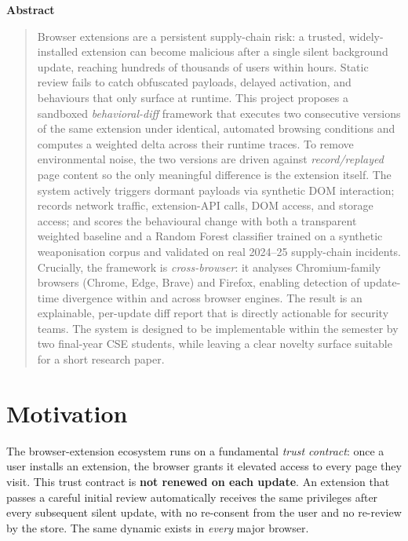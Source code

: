 \documentclass[11pt]{article}
\begin{document}
\begin{center}\textbf{Abstract}\end{center}
\begin{quote}
Browser extensions are a persistent supply-chain risk: a trusted, widely-installed extension can
become malicious after a single silent background update, reaching hundreds of thousands of users
within hours. Static review fails to catch obfuscated payloads, delayed activation, and behaviours
that only surface at runtime. This project proposes a sandboxed \emph{behavioral-diff} framework
that executes two consecutive versions of the same extension under identical, automated browsing
conditions and computes a weighted delta across their runtime traces. To remove environmental noise,
the two versions are driven against \emph{record/replayed} page content so the only meaningful
difference is the extension itself. The system actively triggers dormant payloads via synthetic DOM
interaction; records network traffic, extension-API calls, DOM access, and storage access; and scores
the behavioural change with both a transparent weighted baseline and a Random Forest classifier
trained on a synthetic weaponisation corpus and validated on real 2024--25 supply-chain incidents.
Crucially, the framework is \emph{cross-browser}: it analyses Chromium-family browsers
(Chrome, Edge, Brave) and Firefox, enabling detection of update-time divergence within and across
browser engines. The result is an explainable, per-update diff report that is directly actionable for
security teams. The system is designed to be implementable within the semester by two final-year CSE
students, while leaving a clear novelty surface suitable for a short research paper.
\end{quote}

\vspace{0.5em}

\section{Motivation}
The browser-extension ecosystem runs on a fundamental \emph{trust contract}: once a user installs an
extension, the browser grants it elevated access to every page they visit. This trust contract is
\textbf{not renewed on each update}. An extension that passes a careful initial review automatically
receives the same privileges after every subsequent silent update, with no re-consent from the user
and no re-review by the store. The same dynamic exists in \emph{every} major browser.
\end{document}
